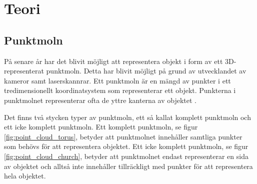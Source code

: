 \chapter{Teori}
\label{cha:theory}

\section{Punktmoln}
På senare år har det blivit möjligt att representera objekt i form av ett 3D-representerat punkt\-moln. Detta har blivit möjligt på grund av utvecklandet av kameror samt laserskannrar. Ett punktmoln är en mängd av punkter i ett tredimensionellt koordinatsystem som representerar ett objekt. Punkterna i punktmolnet representerar ofta de yttre kanterna av objektet \cite{point_cloud}.

Det finns två stycken typer av punktmoln, ett så kallat komplett punktmoln och ett icke komplett punktmoln. Ett komplett punktmoln, se figur \ref{fig:point_cloud_torus}, betyder att punktmolnet innehåller samtliga punkter som behövs för att representera objektet. Ett icke komplett punktmoln, se figur \ref{fig:point_cloud_church}, betyder att punktmolnet endast representerar en sida av objektet och alltså inte innehåller tillräckligt med punkter för att representera hela objektet.

